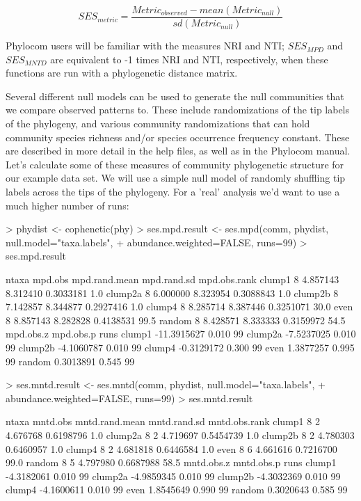 \documentclass[12pt]{article}
\begin{document}
\[SES_{metric} =  \frac{ Metric_{observed} - mean(Metric_{null}) }{sd(Metric_{null})}\]

\noindent Phylocom users will be familiar with the measures NRI and NTI; $SES_{MPD}$ and $SES_{MNTD}$ are equivalent to -1 times NRI and NTI, respectively, when these functions are run with a phylogenetic distance matrix.

Several different null models can be used to generate the null communities that we compare observed patterns to. These include randomizations of the tip labels of the phylogeny, and various community randomizations that can hold community species richness and/or species occurrence frequency constant. These are described in more detail in the help files, as well as in the Phylocom manual. Let's calculate some of these measures of community phylogenetic structure for our example data set. We will use a simple null model of randomly shuffling tip labels across the tips of the phylogeny. For a 'real' analysis we'd want to use a much higher number of runs:

\begin{Schunk}
\begin{Sinput}
> phydist <- cophenetic(phy)
> ses.mpd.result <- ses.mpd(comm, phydist, null.model="taxa.labels",
+                           abundance.weighted=FALSE, runs=99)
> ses.mpd.result
\end{Sinput}
\begin{Soutput}
        ntaxa  mpd.obs mpd.rand.mean mpd.rand.sd mpd.obs.rank
clump1      8 4.857143      8.312410   0.3033181          1.0
clump2a     8 6.000000      8.323954   0.3088843          1.0
clump2b     8 7.142857      8.344877   0.2927416          1.0
clump4      8 8.285714      8.387446   0.3251071         30.0
even        8 8.857143      8.282828   0.4138531         99.5
random      8 8.428571      8.333333   0.3159972         54.5
          mpd.obs.z mpd.obs.p runs
clump1  -11.3915627     0.010   99
clump2a  -7.5237025     0.010   99
clump2b  -4.1060787     0.010   99
clump4   -0.3129172     0.300   99
even      1.3877257     0.995   99
random    0.3013891     0.545   99
\end{Soutput}
\begin{Sinput}
> ses.mntd.result <- ses.mntd(comm, phydist, null.model="taxa.labels",
+                             abundance.weighted=FALSE, runs=99)
> ses.mntd.result
\end{Sinput}
\begin{Soutput}
        ntaxa mntd.obs mntd.rand.mean mntd.rand.sd mntd.obs.rank
clump1      8        2       4.676768    0.6198796           1.0
clump2a     8        2       4.719697    0.5454739           1.0
clump2b     8        2       4.780303    0.6460957           1.0
clump4      8        2       4.681818    0.6446584           1.0
even        8        6       4.661616    0.7216700          99.0
random      8        5       4.797980    0.6687988          58.5
        mntd.obs.z mntd.obs.p runs
clump1  -4.3182061      0.010   99
clump2a -4.9859345      0.010   99
clump2b -4.3032369      0.010   99
clump4  -4.1600611      0.010   99
even     1.8545649      0.990   99
random   0.3020643      0.585   99
\end{Soutput}
\end{Schunk}
\end{document}
